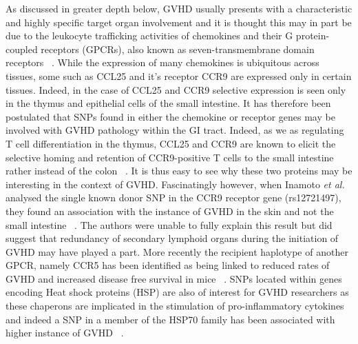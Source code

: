 As discussed in greater depth below, GVHD usually presents with a characteristic and highly specific target organ involvement and it is thought this may in part be due to the leukocyte trafficking activities of chemokines and their G protein-coupled receptors (GPCRs), also known as seven-transmembrane domain receptors ~\autocite{Ina2010}. While the expression of many chemokines is ubiquitous across tissues, some such as CCL25 and it's receptor CCR9 are expressed only in certain tissues. Indeed, in the case of CCL25 and CCR9 selective expression is seen only in the thymus and epithelial cells of the small intestine. It has therefore been postulated that SNPs found in either the chemokine or receptor genes may be involved with GVHD pathology within the GI tract. Indeed, as we as regulating T cell differentiation in the thymus, CCL25 and CCR9 are known to elicit the  selective homing and retention of CCR9-positive T cells to the small intestine rather instead of the colon ~\autocite{Ina2010}. It is thus easy to see why these two proteins may be interesting in the context of GVHD. Fascinatingly however, when Inamoto \textit{et al.} analysed the single known donor SNP in the CCR9 receptor gene (rs12721497), they found an association with the instance of GVHD in the skin and not the small intestine ~\autocite{Ina2010}. The authors were unable to fully explain this result but did suggest that redundancy of secondary lymphoid organs during the initiation of GVHD may have played a part. More recently the recipient haplotype of another GPCR, namely CCR5 has been identified as being linked to reduced rates of GVHD and increased disease free survival in mice ~\autocite{Tin2013}. SNPs located within genes encoding Heat shock proteins (HSP) are also of interest for GVHD researchers as these chaperons are implicated in the stimulation of pro-inflammatory cytokines and indeed a SNP in a member of the HSP70 family has been associated with higher instance of GVHD ~\autocite{Tin2013}.

